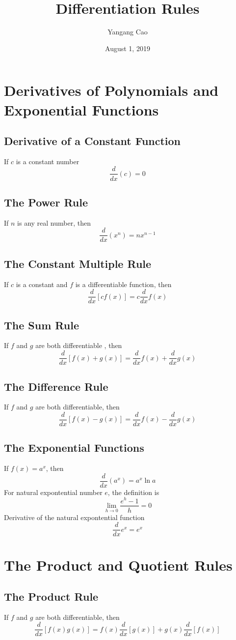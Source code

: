 \documentclass[10pt,a4paper,oneside]{article}
\author{Yangang Cao}
\date{August 1, 2019}
\title{Differentiation Rules}
\newcommand{\watermark}[3]{\AddToShipoutPictureBG{
		\parbox[b][\paperheight]{\paperwidth}{
			\vfill%
			\centering%
			\tikz[remember picture, overlay]%
			\node [rotate = #1, scale = #2] at (current page.center)%
			{\textcolor{gray!70!cyan!40!red!20}{#3}};
			\vfill}}}
\begin{document}
\maketitle
\tableofcontents

\newpage

\section{Derivatives of Polynomials and Exponential Functions}
\subsection{Derivative of a Constant Function}
If $c$ is a constant number
\[
\frac{d}{dx}(c)=0
\]
\subsection{The Power Rule}
If $n$ is any real number, then
\[
\frac{d}{dx}(x^n)=nx^{n-1}
\]
\subsection{The Constant Multiple Rule}
If $c$ is a constant and $f$ is a differentiable function, then
\[
\frac{d}{dx}[cf(x)]=c\frac{d}{dx}f(x)
\]
\subsection{The Sum Rule}
If $f$ and $g$ are both differentiable , then
\[
\frac{d}{dx}[f(x)+g(x)]=\frac{d}{dx}f(x)+\frac{d}{dx}g(x)
\]
\subsection{The Difference Rule}
If $f$ and $g$ are both differentiable, then
\[
\frac{d}{dx}[f(x)-g(x)]=\frac{d}{dx}f(x)-\frac{d}{dx}g(x)
\]
\subsection{The Exponential Functions}
If $f(x)=a^x$, then
\[
\frac{d}{dx}(a^x)=a^x\ln a
\]
For natural expontential number $e$, the definition is
\[
\lim\limits_{h\rightarrow0}\frac{e^h-1}{h}=0
\]
Derivative of the natural expontential function
\[
\frac{d}{dx}e^x=e^x
\]
\section{The Product and Quotient Rules}
\subsection{The Product Rule}
If $f$ and $g$ are both differentiable, then
\[
\frac{d}{dx}[f(x)g(x)]=f(x)\frac{d}{dx}[g(x)]+g(x)\frac{d}{dx}[f(x)]
\]
\end{document}
